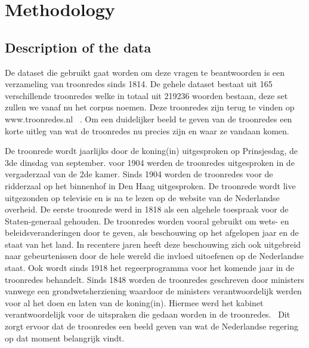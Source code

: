 \section{Methodology}
\label{sec:meth}


\subsection{Description of the data}
De dataset die gebruikt gaat worden om deze vragen te beantwoorden is een verzameling van troonredes sinds 1814. De gehele dataset bestaat uit 165 verschillende troonredes welke in totaal uit 219236 woorden bestaan, deze set zullen we vanaf nu het corpus noemen. Deze troonredes zijn terug te vinden op www.troonredes.nl~\citep{troonredes} . Om een duidelijker beeld te geven van de troonredes een korte uitleg van wat de troonredes nu precies zijn en waar ze vandaan komen. 

De troonrede wordt jaarlijks door de koning(in) uitgesproken op Prinsjesdag, de 3de dinsdag van september. voor 1904 werden de troonredes uitgesproken in de vergaderzaal van de 2de kamer. Sinds 1904 worden de troonredes voor de ridderzaal op het binnenhof in Den Haag uitgesproken. De troonrede wordt live uitgezonden op televisie en is na te lezen op de website van de Nederlandse overheid. De eerste troonrede werd in 1818 als een algehele toespraak voor de Staten-generaal gehouden. De troonredes worden vooral gebruikt om wets- en beleidsveranderingen door te geven, als beschouwing op het afgelopen jaar en de staat van het land. In recentere jaren heeft deze beschouwing zich ook uitgebreid naar gebeurtenissen door de hele wereld die invloed uitoefenen op de Nederlandse staat. Ook wordt sinds 1918 het regeerprogramma voor het komende jaar in de troonredes behandelt. Sinds 1848 worden de troonredes geschreven door ministers vanwege een grondwetsherziening waardoor de ministers verantwoordelijk werden voor al het doen en laten van de koning(in). Hiermee werd het kabinet verantwoordelijk voor de uitspraken die gedaan worden in de troonredes.~\citep{overheid} Dit zorgt ervoor dat de troonredes een beeld geven van wat de Nederlandse regering op dat moment belangrijk vindt.

